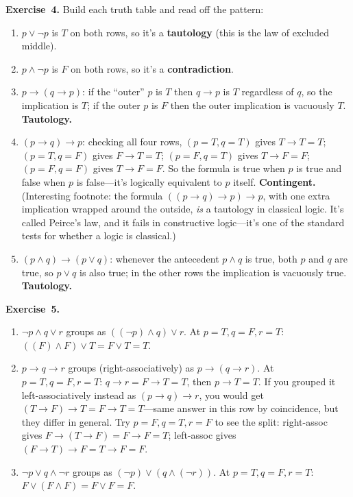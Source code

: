 \documentclass[11pt]{article}
\begin{document}
\medskip
\textbf{Exercise~4.}
Build each truth table and read off the pattern:
\begin{enumerate}[label=(\alph*)]
  \item $p \vee \lnot p$ is $T$ on both rows, so it's a \textbf{tautology} (this is the law of excluded middle).
  \item $p \wedge \lnot p$ is $F$ on both rows, so it's a \textbf{contradiction}.
  \item $p \to (q \to p)$: if the ``outer'' $p$ is $T$ then $q \to p$ is $T$ regardless of $q$, so the implication is $T$; if the outer $p$ is $F$ then the outer implication is vacuously $T$. \textbf{Tautology.}
  \item $(p \to q) \to p$: checking all four rows, $(p=T, q=T)$ gives $T \to T = T$; $(p=T, q=F)$ gives $F \to T = T$; $(p=F, q=T)$ gives $T \to F = F$; $(p=F, q=F)$ gives $T \to F = F$. So the formula is true when $p$ is true and false when $p$ is false---it's logically equivalent to $p$ itself. \textbf{Contingent.} (Interesting footnote: the formula $((p \to q) \to p) \to p$, with one extra implication wrapped around the outside, \emph{is} a tautology in classical logic. It's called Peirce's law, and it fails in constructive logic---it's one of the standard tests for whether a logic is classical.)
  \item $(p \wedge q) \to (p \vee q)$: whenever the antecedent $p \wedge q$ is true, both $p$ and $q$ are true, so $p \vee q$ is also true; in the other rows the implication is vacuously true. \textbf{Tautology.}
\end{enumerate}

\medskip
\textbf{Exercise~5.}
\begin{enumerate}[label=(\alph*)]
  \item $\lnot p \wedge q \vee r$ groups as $((\lnot p) \wedge q) \vee r$. At $p = T, q = F, r = T$: $((F) \wedge F) \vee T = F \vee T = T$.
  \item $p \to q \to r$ groups (right-associatively) as $p \to (q \to r)$. At $p = T, q = F, r = T$: $q \to r = F \to T = T$, then $p \to T = T$. If you grouped it left-associatively instead as $(p \to q) \to r$, you would get $(T \to F) \to T = F \to T = T$---same answer in this row by coincidence, but they differ in general. Try $p = F, q = T, r = F$ to see the split: right-assoc gives $F \to (T \to F) = F \to F = T$; left-assoc gives $(F \to T) \to F = T \to F = F$.
  \item $\lnot p \vee q \wedge \lnot r$ groups as $(\lnot p) \vee (q \wedge (\lnot r))$. At $p = T, q = F, r = T$: $F \vee (F \wedge F) = F \vee F = F$.
\end{enumerate}
\end{document}
